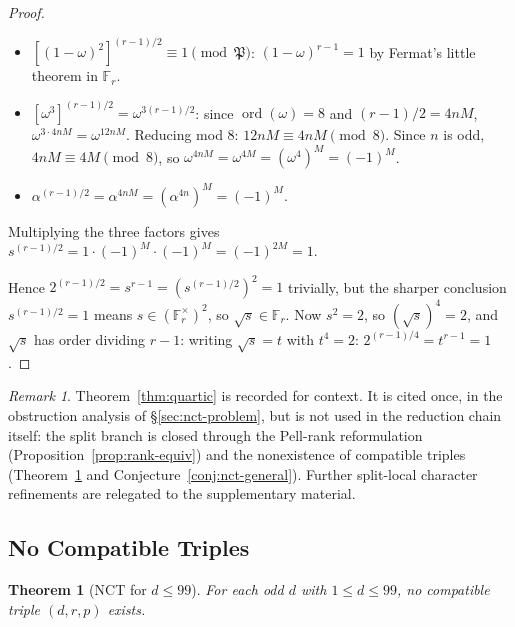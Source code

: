 \documentclass[11pt]{amsart}
\theoremstyle{plain}
\newtheorem{theorem}{Theorem}[section]
\theoremstyle{definition}
\theoremstyle{remark}
\newtheorem*{remarknonum}{Remark}
\numberwithin{equation}{section}
\newcommand{\ord}{\operatorname{ord}}
\newcommand{\F}{\mathbb{F}}
\begin{document}
\begin{proof}
\begin{itemize}
\item $[(1 - \omega)^2]^{(r-1)/2} \equiv 1 \pmod{\mathfrak{P}}$: $(1 - \omega)^{r-1} = 1$ by Fermat's little theorem in $\F_r$.
\item $[\omega^3]^{(r-1)/2} = \omega^{3(r-1)/2}$: since $\ord(\omega) = 8$ and $(r-1)/2 = 4 n M$, $\omega^{3 \cdot 4 n M} = \omega^{12 n M}$. Reducing mod 8: $12 n M \equiv 4 n M \pmod 8$. Since $n$ is odd, $4 n M \equiv 4 M \pmod 8$, so $\omega^{4 n M} = \omega^{4 M} = (\omega^4)^M = (-1)^M$.
\item $\alpha^{(r-1)/2} = \alpha^{4 n M} = (\alpha^{4n})^M = (-1)^M$.
\end{itemize}

Multiplying the three factors gives $s^{(r-1)/2} = 1 \cdot (-1)^M \cdot (-1)^M = (-1)^{2 M} = 1$.

Hence $2^{(r-1)/2} = s^{r-1} = (s^{(r-1)/2})^2 = 1$ trivially, but the sharper conclusion $s^{(r-1)/2} = 1$ means $s \in (\F_r^\times)^2$, so $\sqrt s \in \F_r$. Now $s^2 = 2$, so $(\sqrt s)^4 = 2$, and $\sqrt s$ has order dividing $r - 1$: writing $\sqrt s = t$ with $t^4 = 2$: $2^{(r-1)/4} = t^{r-1} = 1$.
\end{proof}

\begin{remarknonum}
Theorem~\ref{thm:quartic} is recorded for context. It is cited once, in the obstruction analysis of \S\ref{sec:nct-problem}, but is not used in the reduction chain itself: the split branch is closed through the Pell-rank reformulation (Proposition~\ref{prop:rank-equiv}) and the nonexistence of compatible triples (Theorem~\ref{thm:nct99} and Conjecture~\ref{conj:nct-general}). Further split-local character refinements are relegated to the supplementary material.
\end{remarknonum}

\subsection{No Compatible Triples}\label{sec:nct}

\begin{theorem}[NCT for $d \leq 99$]\label{thm:nct99}
For each odd $d$ with $1 \leq d \leq 99$, no compatible triple $(d, r, p)$ exists.
\end{theorem}
\end{document}
